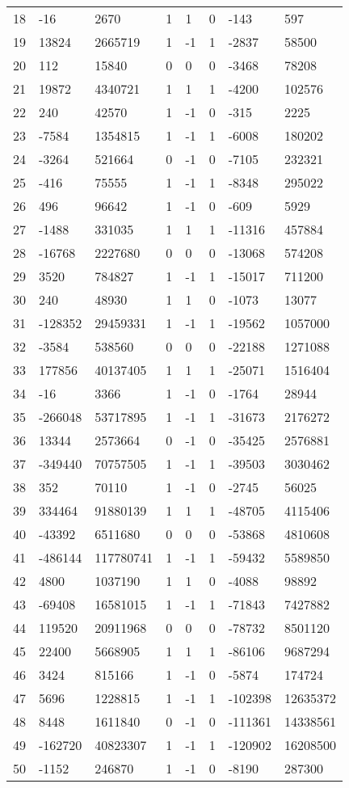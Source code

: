 \documentclass{amsart}
\begin{document}
\begin{longtable}{|l|l|l|lllll|}
18&-16&2670&1&1&0&-143&597\\
19&13824&2665719&1&-1&1&-2837&58500\\
20&112&15840&0&0&0&-3468&78208\\
21&19872&4340721&1&1&1&-4200&102576\\
22&240&42570&1&-1&0&-315&2225\\
23&-7584&1354815&1&-1&1&-6008&180202\\
24&-3264&521664&0&-1&0&-7105&232321\\
25&-416&75555&1&-1&1&-8348&295022\\
26&496&96642&1&-1&0&-609&5929\\
27&-1488&331035&1&1&1&-11316&457884\\
28&-16768&2227680&0&0&0&-13068&574208\\
29&3520&784827&1&-1&1&-15017&711200\\
30&240&48930&1&1&0&-1073&13077\\
31&-128352&29459331&1&-1&1&-19562&1057000\\
32&-3584&538560&0&0&0&-22188&1271088\\
33&177856&40137405&1&1&1&-25071&1516404\\
34&-16&3366&1&-1&0&-1764&28944\\
35&-266048&53717895&1&-1&1&-31673&2176272\\
36&13344&2573664&0&-1&0&-35425&2576881\\
37&-349440&70757505&1&-1&1&-39503&3030462\\
38&352&70110&1&-1&0&-2745&56025\\
39&334464&91880139&1&1&1&-48705&4115406\\
40&-43392&6511680&0&0&0&-53868&4810608\\
41&-486144&117780741&1&-1&1&-59432&5589850\\
42&4800&1037190&1&1&0&-4088&98892\\
43&-69408&16581015&1&-1&1&-71843&7427882\\
44&119520&20911968&0&0&0&-78732&8501120\\
45&22400&5668905&1&1&1&-86106&9687294\\
46&3424&815166&1&-1&0&-5874&174724\\
47&5696&1228815&1&-1&1&-102398&12635372\\
48&8448&1611840&0&-1&0&-111361&14338561\\
49&-162720&40823307&1&-1&1&-120902&16208500\\
50&-1152&246870&1&-1&0&-8190&287300\\
\hline
\end{longtable}
\end{document}
